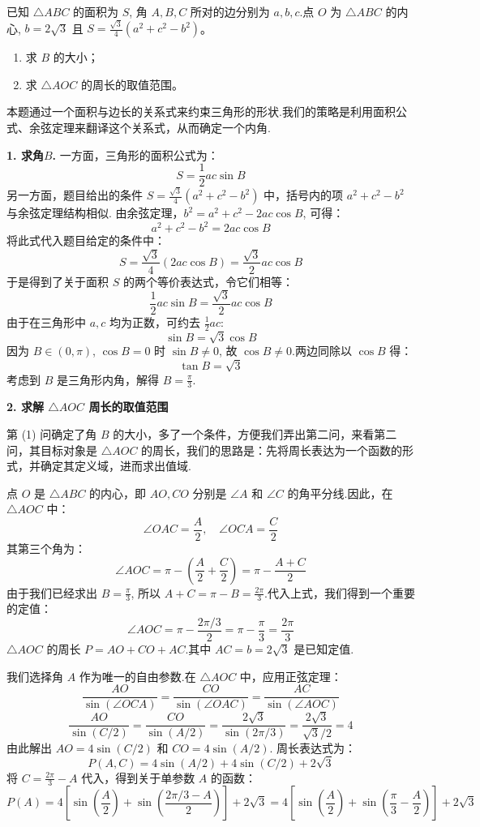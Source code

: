\begin{prob}[topic={面积公式与内心}, score=12]
已知 $\triangle ABC$ 的面积为 $S$, 角 $A,B,C$ 所对的边分别为 $a,b,c$.点 $O$ 为 $\triangle ABC$ 的内心, $b = 2\sqrt{3}$ 且 $S = \frac{\sqrt{3}}{4}(a^2+c^2-b^2)$。
\begin{enumerate}
	\item[(1)] 求 $B$ 的大小；
	\item[(2)] 求 $\triangle AOC$ 的周长的取值范围。
\end{enumerate}
\end{prob}
\begin{prob-sol}
本题通过一个面积与边长的关系式来约束三角形的形状.我们的策略是利用面积公式、余弦定理来翻译这个关系式，从而确定一个内角.

\textbf{1. 求角$B$.}
一方面，三角形的面积公式为：
\[
S = \frac{1}{2}ac\sin B
\]
另一方面，题目给出的条件 $S = \frac{\sqrt{3}}{4}(a^2+c^2-b^2)$ 中，括号内的项 $a^2+c^2-b^2$ 与余弦定理结构相似.
由余弦定理，$b^2 = a^2+c^2 - 2ac\cos B$, 可得：
\[
a^2+c^2-b^2 = 2ac\cos B
\]
将此式代入题目给定的条件中：
\[
S = \frac{\sqrt{3}}{4}(2ac\cos B) = \frac{\sqrt{3}}{2}ac\cos B
\]
于是得到了关于面积 $S$ 的两个等价表达式，令它们相等：
\[
\frac{1}{2}ac\sin B = \frac{\sqrt{3}}{2}ac\cos B
\]
由于在三角形中 $a, c$ 均为正数，可约去 $\frac{1}{2}ac$:
\[
\sin B = \sqrt{3}\cos B
\]
因为 $B \in (0, \pi)$, $\cos B=0$ 时 $\sin B \neq 0$, 故 $\cos B \neq 0$.两边同除以 $\cos B$ 得：
\[
\tan B = \sqrt{3}
\]
考虑到 $B$ 是三角形内角，解得 $B = \frac{\pi}{3}$.

\textbf{2. 求解 $\triangle AOC$ 周长的取值范围}

第 (1) 问确定了角 $B$ 的大小，多了一个条件，方便我们弄出第二问，来看第二问，其目标对象是 $\triangle AOC$ 的周长，我们的思路是：先将周长表达为一个函数的形式，并确定其定义域，进而求出值域.

点 $O$ 是 $\triangle ABC$ 的内心，即 $AO, CO$ 分别是 $\angle A$ 和 $\angle C$ 的角平分线.因此，在 $\triangle AOC$ 中：
\[
\angle OAC = \frac{A}{2}, \quad \angle OCA = \frac{C}{2}
\]
其第三个角为：
\[
\angle AOC = \pi - \left(\frac{A}{2} + \frac{C}{2}\right) = \pi - \frac{A+C}{2}
\]
由于我们已经求出 $B=\frac{\pi}{3}$, 所以 $A+C = \pi - B = \frac{2\pi}{3}$.代入上式，我们得到一个重要的定值：
\[
\angle AOC = \pi - \frac{2\pi/3}{2} = \pi - \frac{\pi}{3} = \frac{2\pi}{3}
\]
$\triangle AOC$ 的周长 $P = AO + CO + AC$.其中 $AC = b = 2\sqrt{3}$ 是已知定值.

我们选择角 $A$ 作为唯一的自由参数.在 $\triangle AOC$ 中，应用正弦定理：
\[
\frac{AO}{\sin(\angle OCA)} = \frac{CO}{\sin(\angle OAC)} = \frac{AC}{\sin(\angle AOC)}
\]
\[
\frac{AO}{\sin(C/2)} = \frac{CO}{\sin(A/2)} = \frac{2\sqrt{3}}{\sin(2\pi/3)} = \frac{2\sqrt{3}}{\sqrt{3}/2} = 4
\]
由此解出 $AO = 4\sin(C/2)$ 和 $CO = 4\sin(A/2)$.
周长表达式为：
\[
P(A,C) = 4\sin(A/2) + 4\sin(C/2) + 2\sqrt{3}
\]
将 $C = \frac{2\pi}{3}-A$ 代入，得到关于单参数 $A$ 的函数：
\[
P(A) = 4\left[\sin\left(\frac{A}{2}\right) + \sin\left(\frac{2\pi/3-A}{2}\right)\right] + 2\sqrt{3} = 4\left[\sin\left(\frac{A}{2}\right) + \sin\left(\frac{\pi}{3}-\frac{A}{2}\right)\right] + 2\sqrt{3}
\]


\end{prob-sol}
